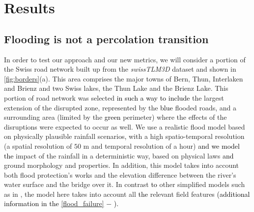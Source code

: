 \documentclass[twocolumn,fleqn,10pt]{wlscirep}
\begin{document}
\section*{Results}
\label{Results} 


\subsection*{Flooding is not a percolation transition}
\label{Temporal_percolation} 



In order to test our approach and our new metrics, we will consider a portion of the Swiss road network built up from the \emph{swissTLM3D} dataset 
\cite{Swisstopo} and shown in \cref{fig:borders}(a). This area comprises the major towns of Bern, Thun, Interlaken and Brienz and two Swiss lakes, the Thun Lake and the Brienz Lake. This portion of road network was selected \textcolor{black}{in such a way to include} the largest extension of the disrupted zone, represented by the \textcolor{black}{blue} flooded roads, and a surrounding area (limited by the \textcolor{black}{green} perimeter) where the effects of the disruptions were expected to occur as well. We use a realistic flood model \cite{Zischg} based on physically plausible rainfall scenarios\textcolor{black}{,} with a high spatio-temporal resolution (a spatial resolution of $50$ m and temporal resolution of a hour) \textcolor{black}{and we model the} impact of the rainfall in a deterministic way\textcolor{black}{,} based on physical laws \textcolor{black}{and} ground morphology and properties. In addition, this model takes into account both flood protection's works and the elevation difference between the river's water surface and the bridge over it. In contrast \textcolor{black}{to} other simplified models such as in
\textcolor{black}{
\cite{Abdulla2019_conference_paper,Abdulla2020_conference_paper,Abdulla2020_SIS,Abdulla2021,Fan2020,Farahmand2020,Dong2020a,Dong2020b,Ganin,Wang2019,Yadav}}
, the model here takes into account all \textcolor{black}{the} relevant field features
\textcolor{black}{
(additional information in the \cref{flood_failure} $-$ ).}
\end{document}
